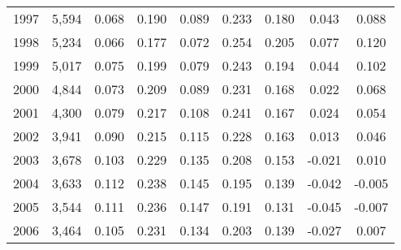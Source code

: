 \begin{tabular}{l c c c c c c c c}
1997&5,594&0.068&0.190&0.089&0.233&0.180&0.043&0.088\\
1998&5,234&0.066&0.177&0.072&0.254&0.205&0.077&0.120\\
1999&5,017&0.075&0.199&0.079&0.243&0.194&0.044&0.102\\
2000&4,844&0.073&0.209&0.089&0.231&0.168&0.022&0.068\\
2001&4,300&0.079&0.217&0.108&0.241&0.167&0.024&0.054\\
2002&3,941&0.090&0.215&0.115&0.228&0.163&0.013&0.046\\
2003&3,678&0.103&0.229&0.135&0.208&0.153&-0.021&0.010\\
2004&3,633&0.112&0.238&0.145&0.195&0.139&-0.042&-0.005\\
2005&3,544&0.111&0.236&0.147&0.191&0.131&-0.045&-0.007\\
2006&3,464&0.105&0.231&0.134&0.203&0.139&-0.027&0.007\\
\bottomrule
\end{tabular}
